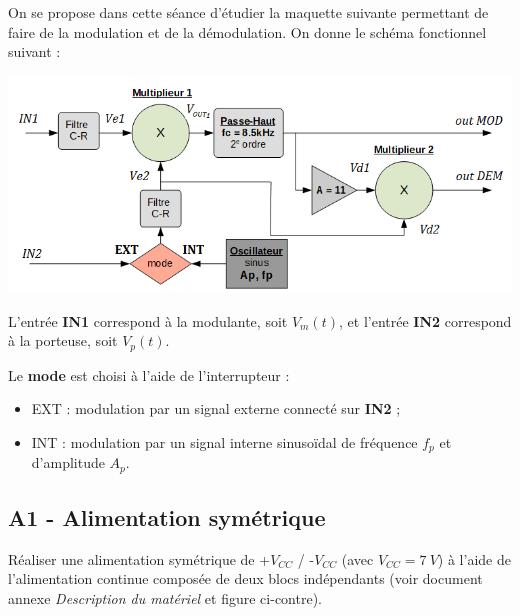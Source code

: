 \documentclass[a4paper,11pt]{article}
\begin{document}
On se propose dans cette séance d'étudier la maquette suivante permettant de faire de la modulation et de la démodulation.
On donne le schéma fonctionnel suivant :

	\begin{center}
		\includegraphics{images/systeme.png}
	\end{center}

L'entrée \textbf{IN1} correspond à la modulante, soit $V_m(t)$, et l'entrée \textbf{IN2} correspond à la porteuse, soit $V_p(t)$.

Le \textbf{mode} est choisi à l'aide de l'interrupteur :
\begin{itemize}
	\item	EXT : modulation par un signal externe connecté sur \textbf{IN2} ;
	\item INT : modulation par un signal interne sinusoïdal de fréquence $f_p$ et d'amplitude $A_p$.
\end{itemize}

\newpage
\subsection*{A1 - Alimentation symétrique}

\Real Réaliser une alimentation symétrique de +$V_{CC}$ / -$V_{CC}$ (avec $V_{CC} = 7~V$) à l'aide de l'alimentation continue composée de deux blocs indépendants (voir document annexe \textit{Description du matériel} et figure ci-contre).
\end{document}
